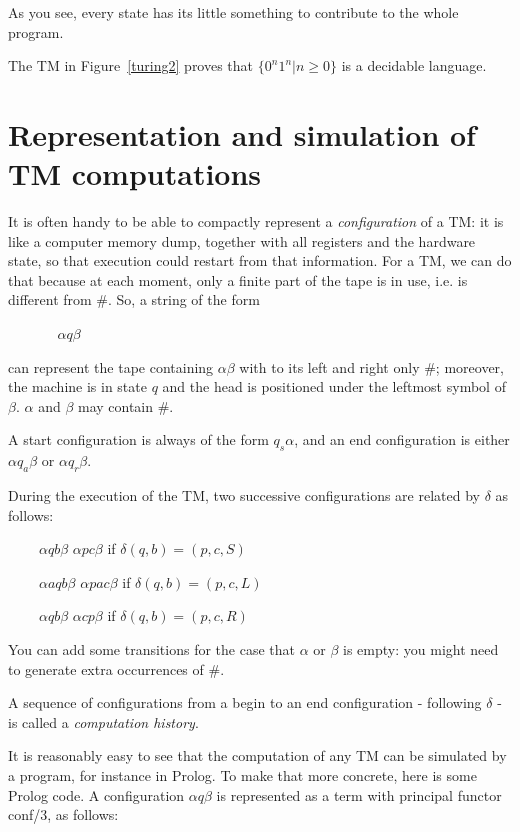 As you see, every state has its little something to contribute to the
whole program.


The TM in Figure~\ref{turing2} proves that
%
$\{0^n1^n|n \geq 0\}$ is a decidable language.

\section{Representation and simulation of TM computations}

It is often handy to be able to compactly represent a {\em
  configuration} of a TM: it is like a computer memory dump, together
with all registers and the hardware state, so that execution could
restart from that information. For a TM, we can do that because at
each moment, only a finite part of the tape is in use, i.e. is
different from \#. So, a string of the form

$~~~~~~~~~~~~~~~~\alpha q \beta$

can represent the tape containing $\alpha\beta$ with to its left and
right only \#; moreover, the machine is in state $q$ and the head is
positioned under the leftmost symbol of $\beta$. $\alpha$ and $\beta$
may contain \#.

A start configuration is always of the form $q_s\alpha$, and an end
configuration is either $\alpha q_a \beta$ or $\alpha q_r \beta$.

During the execution of the TM, two successive configurations are
related by $\delta$ as follows:


$~~~~~~~~~~\alpha q b \beta$ \rpijl $\alpha p c \beta$ if $\delta(q,b) = (p,c,S)$

$~~~~~~~~~~\alpha a q b \beta$ \rpijl $\alpha p a c \beta$ if $\delta(q,b) = (p,c,L)$

$~~~~~~~~~~\alpha q b \beta$ \rpijl $\alpha c p \beta$ if $\delta(q,b) = (p,c,R)$

You can add some transitions for the case that $\alpha$ or $\beta$ is
empty: you might need to generate extra occurrences of \#.


A sequence of configurations from a begin to an end configuration -
following $\delta$ - is called a {\em computation history}.

It is reasonably easy to see that the computation of any TM can be
simulated by a program, for instance in Prolog. To make that more
concrete, here is some Prolog code. A configuration $\alpha q \beta$
is represented as a term with principal functor conf/3, as follows:

